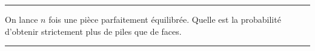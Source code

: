 \documentclass[../PolyS4.tex]{subfiles}
\begin{document}




\hfill\break
\hrule
\hfill\break


On lance $n$ fois une pièce parfaitement équilibrée. Quelle est la probabilité d'obtenir strictement plus de piles que de faces.\\




\hfill\break
\hrule
\hfill\break

\end{document}
